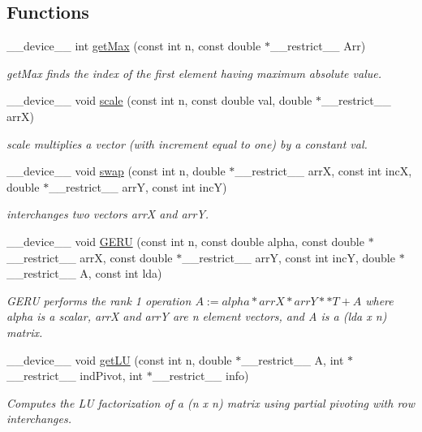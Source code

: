 \subsection*{Functions}
\begin{DoxyCompactItemize}
\item 
\+\_\+\+\_\+device\+\_\+\+\_\+ int \hyperlink{inverse_8cu_a7b3d468c8500704ef2452f40b23810bb}{get\+Max} (const int n, const double $\ast$\+\_\+\+\_\+restrict\+\_\+\+\_\+ Arr)
\begin{DoxyCompactList}\small\item\em get\+Max finds the index of the first element having maximum absolute value. \end{DoxyCompactList}\item 
\+\_\+\+\_\+device\+\_\+\+\_\+ void \hyperlink{inverse_8cu_adbb4f3f3af5f968a94f717729803c88d}{scale} (const int n, const double val, double $\ast$\+\_\+\+\_\+restrict\+\_\+\+\_\+ arrX)
\begin{DoxyCompactList}\small\item\em scale multiplies a vector (with increment equal to one) by a constant val. \end{DoxyCompactList}\item 
\+\_\+\+\_\+device\+\_\+\+\_\+ void \hyperlink{inverse_8cu_adac70ba85b61598b9fcee8a381eed708}{swap} (const int n, double $\ast$\+\_\+\+\_\+restrict\+\_\+\+\_\+ arrX, const int incX, double $\ast$\+\_\+\+\_\+restrict\+\_\+\+\_\+ arrY, const int incY)
\begin{DoxyCompactList}\small\item\em interchanges two vectors arrX and arrY. \end{DoxyCompactList}\item 
\+\_\+\+\_\+device\+\_\+\+\_\+ void \hyperlink{inverse_8cu_a8dbfcd45123f24c8d64e2049ae2782fe}{G\+E\+RU} (const int n, const double alpha, const double $\ast$\+\_\+\+\_\+restrict\+\_\+\+\_\+ arrX, const double $\ast$\+\_\+\+\_\+restrict\+\_\+\+\_\+ arrY, const int incY, double $\ast$\+\_\+\+\_\+restrict\+\_\+\+\_\+ A, const int lda)
\begin{DoxyCompactList}\small\item\em G\+E\+RU performs the rank 1 operation $A := alpha * arrX * arrY **T + A$ where alpha is a scalar, arrX and arrY are n element vectors, and A is a (lda x n) matrix. \end{DoxyCompactList}\item 
\+\_\+\+\_\+device\+\_\+\+\_\+ void \hyperlink{inverse_8cu_a25bf32c703aa4b2a43131df214ee0375}{get\+LU} (const int n, double $\ast$\+\_\+\+\_\+restrict\+\_\+\+\_\+ A, int $\ast$\+\_\+\+\_\+restrict\+\_\+\+\_\+ ind\+Pivot, int $\ast$\+\_\+\+\_\+restrict\+\_\+\+\_\+ info)
\begin{DoxyCompactList}\small\item\em Computes the LU factorization of a (n x n) matrix using partial pivoting with row interchanges. \end{DoxyCompactList}\end{DoxyCompactItemize}


